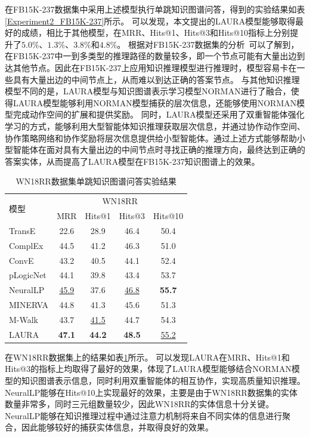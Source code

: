 \documentclass[algorithmlist, AutoFakeBold, AutoFakeSlant, figurelist, tablelist, nomlist, engineering]{seuthesix}
\begin{document}
在FB15K-237数据集中采用上述模型执行单跳知识图谱问答，得到的实验结果如表\ref{Experiment2_FB15K-237}所示。
可以发现，本文提出的LAURA模型能够取得最好的成绩，相比于其他模型，在MRR、Hits@1、Hits@3和Hits@10指标上分别提升了$5.0\%$、$1.3\%$、$3.8\%$和$4.8\%$。
根据对FB15K-237数据集的分析~\cite{wan2021reasoning}可以了解到，在FB15K-237中一到多类型的推理路径的数量较多，即一个节点可能有大量出边到达其他节点。因此在FB15K-237上应用知识推理模型进行推理时，模型容易卡在一些具有大量出边的中间节点上，从而难以到达正确的答案节点。
与其他知识推理模型不同的是，LAURA模型与知识图谱表示学习模型NORMAN进行了融合，使得LAURA模型能够利用NORMAN模型捕获的层次信息，还能够使用NORMAN模型完成动作空间的扩展和提供奖励。
同时，LAURA模型还采用了双重智能体强化学习的方式，能够利用大型智能体知识推理获取层次信息，并通过协作动作空间、协作策略网络和协作奖励将层次信息提供给小型智能体。通过上述方式能够帮助小型智能体在面对具有大量出边的中间节点时寻找正确的推理方向，最终达到正确的答案实体，从而提高了LAURA模型在FB15K-237知识图谱上的效果。

\begin{table}[t]
  \centering
  \caption{WN18RR数据集单跳知识图谱问答实验结果}
  \begin{tabular*}{0.95\textwidth}{@{\extracolsep{\fill}}lcccc}
    \toprule[1pt]
    \multirow{2}{*}{模型} & \multicolumn{4}{c}{WN18RR}   \\
      & MRR & Hits@1 & Hits@3 & Hits@10 \\ \hline
    TransE & 22.6 & 28.9 & 46.4 & 50.4 \\
    ComplEx & 44.5 & 41.2 & 46.3 & 51.0 \\
    ConvE & 43.2 & 40.5 & 44.1 & 52.4 \\
    pLogicNet & 44.1 & 39.8 & 43.4 & 53.7 \\
    NeuralLP & \underline{45.9} & 37.6 & \underline{46.8} & \textbf{55.7} \\
    MINERVA & 44.8 & 41.3 & 45.6 & 51.3 \\
    M-Walk & 43.7 & \underline{41.5} & 44.7 & 54.3 \\
    LAURA & \textbf{47.1} & \textbf{44.2} & \textbf{48.5} & \underline{55.2} \\
    \bottomrule[1pt]
  \end{tabular*}
  \label{Experiment2_WN18RR}
\end{table}

在WN18RR数据集上的结果如表\ref{Experiment2_WN18RR}所示。
可以发现LAURA在MRR、Hits@1和Hits@3的指标上均取得了最好的效果，体现了LAURA模型能够结合NORMAN模型的知识图谱表示信息，同时利用双重智能体的相互协作，实现高质量知识推理。
NeuralLP能够在Hits@10上实现最好的效果，主要是由于WN18RR数据集的实体数量非常多，同时三元组数量较少，因此WN18RR的实体信息十分关键。NeuralLP能够在知识推理过程中通过注意力机制将来自不同实体的信息进行聚合，因此能够较好的捕获实体信息，并取得良好的效果。
\end{document}
